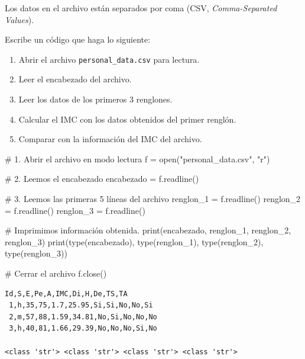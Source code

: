 \documentclass[
  spanish,
  letterpaper,
]{scrbook}
\newenvironment{Shaded}{\begin{snugshade}}{\end{snugshade}}
\newcommand{\BuiltInTok}[1]{\textcolor[rgb]{0.00,0.23,0.31}{#1}}
\newcommand{\CommentTok}[1]{\textcolor[rgb]{0.37,0.37,0.37}{#1}}
\newcommand{\NormalTok}[1]{\textcolor[rgb]{0.00,0.23,0.31}{#1}}
\newcommand{\OperatorTok}[1]{\textcolor[rgb]{0.37,0.37,0.37}{#1}}
\newcommand{\StringTok}[1]{\textcolor[rgb]{0.13,0.47,0.30}{#1}}
\providecommand{\tightlist}{%
  \setlength{\itemsep}{0pt}\setlength{\parskip}{0pt}}
\theoremstyle{definition}
\theoremstyle{remark}
\begin{document}
\begin{tcolorbox}
Los datos en el archivo están separados por coma (CSV,
\emph{Comma-Separated Values}).

Escribe un código que haga lo siguiente:

\begin{enumerate}
\def\labelenumi{\arabic{enumi}.}
\tightlist
\item
  Abrir el archivo \texttt{personal\_data.csv} para lectura.
\item
  Leer el encabezado del archivo.
\item
  Leer los datos de los primeros 3 renglones.
\item
  Calcular el IMC con los datos obtenidos del primer renglón.
\item
  Comparar con la información del IMC del archivo.
\end{enumerate}

\end{tcolorbox}

\begin{Shaded}
\begin{Highlighting}[]
\CommentTok{\# 1. Abrir el archivo en modo lectura}
\NormalTok{f }\OperatorTok{=} \BuiltInTok{open}\NormalTok{(}\StringTok{"personal\_data.csv"}\NormalTok{, }\StringTok{"r"}\NormalTok{)}

\CommentTok{\# 2. Leemos el encabezado}
\NormalTok{encabezado }\OperatorTok{=}\NormalTok{ f.readline()}

\CommentTok{\# 3. Leemos las primeras 5 líneas del archivo}
\NormalTok{renglon\_1 }\OperatorTok{=}\NormalTok{ f.readline()}
\NormalTok{renglon\_2 }\OperatorTok{=}\NormalTok{ f.readline()}
\NormalTok{renglon\_3 }\OperatorTok{=}\NormalTok{ f.readline()}

\CommentTok{\# Imprimimos información obtenida.}
\BuiltInTok{print}\NormalTok{(encabezado, renglon\_1, renglon\_2, renglon\_3)}
\BuiltInTok{print}\NormalTok{(}\BuiltInTok{type}\NormalTok{(encabezado), }\BuiltInTok{type}\NormalTok{(renglon\_1), }\BuiltInTok{type}\NormalTok{(renglon\_2), }\BuiltInTok{type}\NormalTok{(renglon\_3))}

\CommentTok{\# Cerrar el archivo}
\NormalTok{f.close()}
\end{Highlighting}
\end{Shaded}

\begin{verbatim}
Id,S,E,Pe,A,IMC,Di,H,De,TS,TA
 1,h,35,75,1.7,25.95,Si,Si,No,No,Si
 2,m,57,88,1.59,34.81,No,Si,No,No,No
 3,h,40,81,1.66,29.39,No,No,No,Si,No

<class 'str'> <class 'str'> <class 'str'> <class 'str'>
\end{verbatim}
\end{document}
